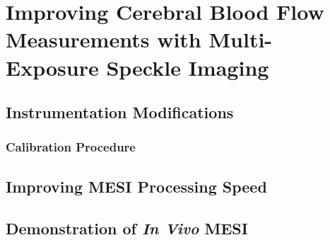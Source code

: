 
\chapter{Improving Cerebral Blood Flow Measurements with Multi-Exposure Speckle Imaging} \label{Chapter_4}

\blindtext



\section{Instrumentation Modifications}

\blindtext

\subsection{Calibration Procedure}

\blindtext



\section{Improving MESI Processing Speed}

\blindtext



\section{Demonstration of \textit{In Vivo} MESI}


